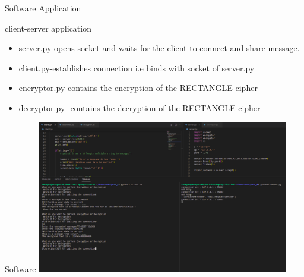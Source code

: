 \begin{frame}{Software Application}
\begin{block}{client-server application}
\begin{itemize}
    \item server.py-opens socket and waits for the client to connect and share message.
    \item client.py-establishes connection i.e binds with socket of server.py
    \item encryptor.py-contains the encryption of the RECTANGLE cipher
    \item decryptor.py- contains the decryption of the RECTANGLE cipher
    

    
\end{itemize}



\end{block}
\end{frame}
\begin{frame}{ Software}
    \centering
\includegraphics[width=110mm]{img_10.png}
\centering
\end{frame}